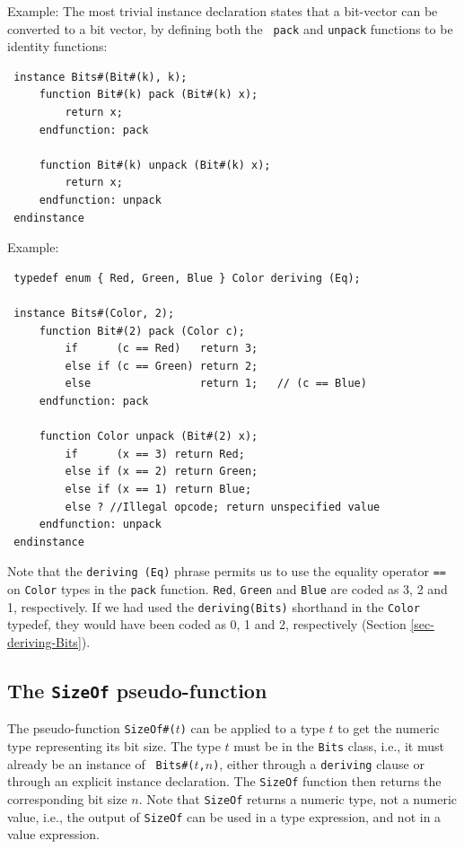 \documentclass[twoside,letterpaper]{article}
\begin{document}
Example:  The most trivial instance declaration states that a
bit-vector can be converted to a bit vector, by defining both the \texttt{
pack} and \texttt{unpack} functions to be identity functions:
\begin{verbatim}
 instance Bits#(Bit#(k), k);
     function Bit#(k) pack (Bit#(k) x);
         return x;
     endfunction: pack

     function Bit#(k) unpack (Bit#(k) x);
         return x;
     endfunction: unpack
 endinstance
\end{verbatim}
Example:
\begin{verbatim}
 typedef enum { Red, Green, Blue } Color deriving (Eq);

 instance Bits#(Color, 2);
     function Bit#(2) pack (Color c);
         if      (c == Red)   return 3;
         else if (c == Green) return 2;
         else                 return 1;   // (c == Blue)
     endfunction: pack

     function Color unpack (Bit#(2) x);
         if      (x == 3) return Red;
         else if (x == 2) return Green;
         else if (x == 1) return Blue;
         else ? //Illegal opcode; return unspecified value
     endfunction: unpack
 endinstance
\end{verbatim}
Note that the \texttt{deriving (Eq)} phrase permits us to use the
equality operator \texttt{==} on \texttt{Color} types in the \texttt{pack}
function.  \texttt{Red}, \texttt{Green} and \texttt{Blue} are coded as 3, 2 and
1, respectively.  If we had used the \texttt{deriving(Bits)} shorthand in
the \texttt{Color} typedef, they would have been coded as 0, 1 and 2,
respectively (Section \ref{sec-deriving-Bits}).


\subsection{The \texttt{SizeOf} pseudo-function}

\label{sec-sizeof}

The pseudo-function \texttt{SizeOf\#($t$)} can be applied to a type $t$ to
get the numeric type representing its bit size.  The type $t$ must be
in the \texttt{Bits} class, i.e., it must already be an instance of {\tt
Bits\#($t$,$n$)}, either through a \texttt{deriving} clause or through an
explicit instance declaration.  The \texttt{SizeOf} function then returns
the corresponding bit size $n$.  Note that \texttt{SizeOf} returns a
numeric type, not a numeric value, i.e., the output of \texttt{SizeOf}
can be used in a type expression, and not in a value expression.
\end{document}

